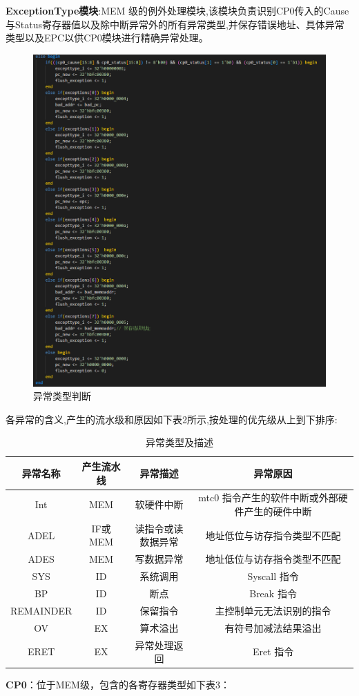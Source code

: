 \textbf{ExceptionType模块}:MEM 级的例外处理模块,该模块负责识别CP0传入的Cause与Status寄存器值以及除中断异常外的所有异常类型,并保存错误地址、具体异常类型以及EPC以供CP0模块进行精确异常处理。 
\begin{figure}
\centering
\includegraphics[width=0.5\linewidth]{image/p5.png}
\caption{异常类型判断}
\label{fig:enter-label}
\end{figure}

各异常的含义,产生的流水级和原因如下表2所示,按处理的优先级从上到下排序:


\begin{table}
\centering
\begin{tabular}{|c|c|c|c|} \hline 
	异常名称&  产生流水线&  异常描述& 异常原因\\ \hline 
	Int&  MEM&  软硬件中断&  mtc0 指令产生的软件中断或外部硬件产生的硬件中断\\ \hline 
	ADEL&  IF或MEM&  读指令或读数据异常& 地址低位与访存指令类型不匹配\\ \hline 
	ADES&  MEM&  写数据异常& 地址低位与访存指令类型不匹配\\ \hline 
	SYS&  ID&  系统调用& Syscall 指令\\ \hline 
	BP&  ID&  断点& Break 指令\\ \hline 
	REMAINDER&  ID&  保留指令& 主控制单元无法识别的指令\\ \hline 
	OV&  EX&  算术溢出& 有符号加减法结果溢出\\ \hline
	ERET& EX& 异常处理返回&Eret 指令\\\hline
\end{tabular}
\caption{异常类型及描述}
\label{tab:my_label}
\end{table}

\textbf{CP0}：位于MEM级，包含的各寄存器类型如下表3：


